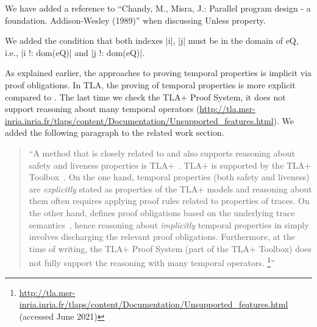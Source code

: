 \documentclass{response}
\begin{document}
\begin{response}
  We have added a reference to ``Chandy, M., Misra, J.: Parallel
  program design - a foundation. Addison-Wesley (1989)'' when
  discussing Unless property.
\end{response}


\begin{comment}{Reviewer \#1}
• p. 26 (Theorem 5) I think that the indexes in eQ should be first stated
as legal in both quantifications.
\end{comment}

\begin{response}
  We added the condition that both indexes |i|, |j| must be in the
  domain of eQ, i.e., |i !: dom(eQ)| and |j !: dom(eQ)|.
\end{response}


\begin{comment}{Reviewer \#1}
• p. 27 All the temporal proofs have been done in an adhoc way without
any tool support. It would be interesting to have a feedback about
this? To be provocative, if you are interested in temporal proofs why
did you choose this tool? Have you considered TLA which does support
temporal proofs (as well as refinements in a certain way)?
\end{comment}

\begin{response}
  As explained earlier, the \EventB approaches to proving temporal
  properties is implicit via proof obligations. In TLA, the proving of
  temporal properties is more explicit compared to \EventB. The last
  time we check the TLA+ Proof System, it does not support reasoning
  about many temporal operators
  (\url{http://tla.msr-inria.inria.fr/tlaps/content/Documentation/Unsupported_features.html}).
  We added the following paragraph to the related work section.
\begin{quote}
    ``A method that is closely related to \mbox{\EventB} and also supports
  reasoning about safety and liveness properties is
  TLA+~\mbox{\cite{DBLP:books/aw/Lamport2002}}. TLA+ is supported by
  the TLA+ Toolbox~\mbox{\cite{DBLP:journals/corr/abs-1912-10633}}.
  On the one hand, temporal properties (both safety and liveness) are
  \emph{explicitly} stated as properties of the TLA+ models and
  reasoning about them often requires applying proof rules related to
  properties of traces. On the other hand, \mbox{\EventB} defines
  proof obligations based on the underlying trace
  semantics~\mbox{\cite{abrial10:_model_event_b,hoang2016ltl,hudon16:_unit_b_method}},
  hence reasoning about \emph{implicitly} temporal properties in
  \mbox{\EventB} simply involves discharging the relevant proof
  obligations. Furthermore, at the time of writing, the TLA+ Proof
  System (part of the TLA+ Toolbox) does not fully support the
  reasoning with many temporal operators.%
\footnote{\url{http://tla.msr-inria.inria.fr/tlaps/content/Documentation/Unsupported_features.html}
  (accessed June 2021)}''
  \end{quote}
\end{response}
\end{document}
